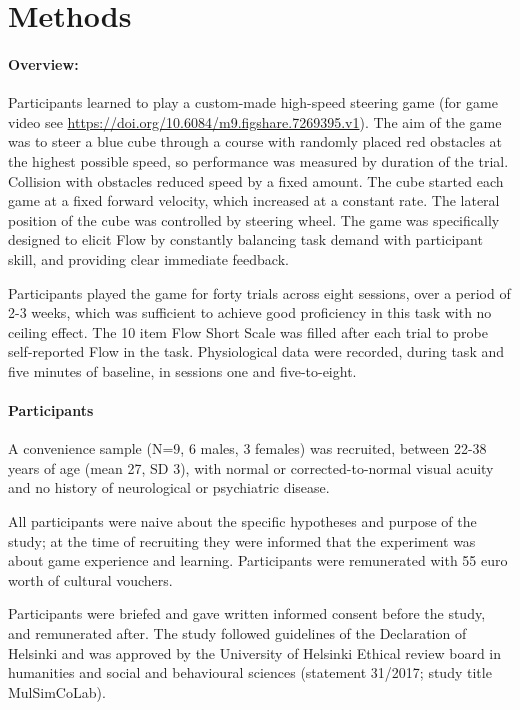 \documentclass[10pt,letterpaper,floatsintext]{article}
\begin{document}
\section{Methods}

\paragraph{Overview:}
Participants learned to play a custom-made high-speed steering game (for game video see \url{https://doi.org/10.6084/m9.figshare.7269395.v1}). The aim of the game was to steer a blue cube through a course with randomly placed red obstacles at the highest possible speed, so performance was measured by duration of the trial. Collision with obstacles reduced speed by a fixed amount. The cube started each game at a fixed forward velocity, which increased at a constant rate. The lateral position of the cube was controlled by steering wheel. The game was specifically designed to elicit Flow by constantly balancing task demand with participant skill, and providing clear immediate feedback.

Participants played the game for forty trials across eight sessions, over a period of 2-3 weeks, which was sufficient to achieve good proficiency in this task with no ceiling effect. The 10 item Flow Short Scale \cite{Engeser2008} was filled after each trial to probe self-reported Flow in the task. Physiological data were recorded, during task and five minutes of baseline, in sessions one and five-to-eight.


\paragraph{Participants}
A convenience sample (N=9, 6 males, 3 females) was recruited, between 22-38 years of age (mean 27, SD 3), with normal or corrected-to-normal visual acuity and no history of neurological or psychiatric disease.

All participants were naive about the specific hypotheses and purpose of the study; at the time of recruiting they were informed that the experiment was about game experience and learning. Participants were remunerated with 55 euro worth of cultural vouchers.

Participants were briefed and gave written informed consent before the study, and remunerated after. The study followed guidelines of the Declaration of Helsinki and was approved by the University of Helsinki Ethical review board in humanities and social and behavioural sciences (statement 31/2017; study title MulSimCoLab).
\end{document}
